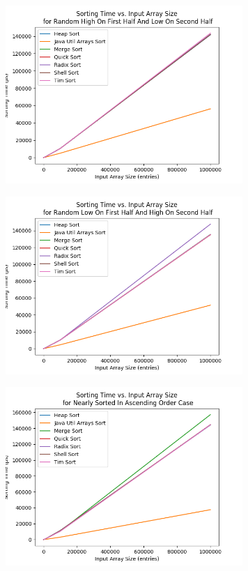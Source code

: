\begin{figure}[!htp]
\centering
\includegraphics[width=9cm]{figures/plots_without_BubbleSort_InsertionSort/sorting_time_vs_input_array_size_RandomHighOnFirstHalfAndLowOnSecondHalf.png}
\end{figure}

\begin{figure}[!htp]
\centering
\includegraphics[width=9cm]{figures/plots_without_BubbleSort_InsertionSort/sorting_time_vs_input_array_size_RandomLowOnFirstHalfAndHighOnSecondHalf.png}
\end{figure}

\begin{figure}[!htp]
\centering
\includegraphics[width=9cm]{figures/plots_without_BubbleSort_InsertionSort/sorting_time_vs_input_array_size_NearlySortedInAscendingOrderCase.png}
\end{figure}

